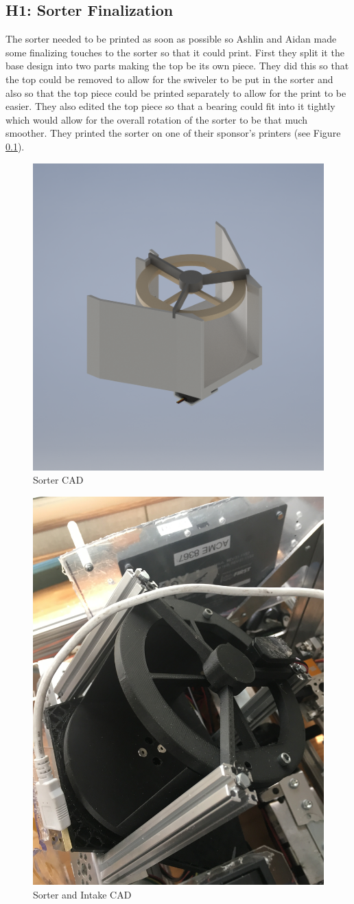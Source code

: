 \documentclass{article}
\begin{document}
\subsection{H1: Sorter Finalization}

The sorter needed to be printed as soon as possible so Ashlin and Aidan made some finalizing touches to the sorter so that it could print. First they split it the base design into two parts making the top be its own piece. They did this so that the top could be removed to allow for the swiveler to be put in the sorter and also so that the top piece could be printed separately to allow for the print to be easier. They also edited the top piece so that a bearing could fit into it tightly which would allow for the overall rotation of the sorter to be that much smoother. They printed the sorter on one of their sponsor's printers (see Figure \ref{}).

\begin{figure}
    \centering
    \includegraphics[width=.6 \textwidth, ]{10_11-05/images/og_sorter[1].png}
    \caption{Sorter CAD}
    \label{fig:Sorter CAD}
\end{figure}

\begin{figure}
    \centering
    \includegraphics[width=.6 \textwidth, angle=270 ]{10_11-05/images/sorter.JPG}
    \caption{Sorter and Intake CAD}
    \label{fig:Intake CAD}
\end{figure}
\end{document}
